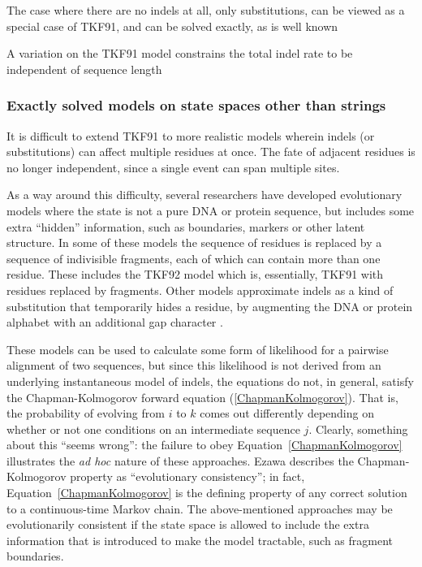 \documentclass{bmcart}
\newcommand{\eqref}[1]{Equation~\ref{#1}}
\begin{document}
The case where there are no indels at all, only substitutions, can be viewed as a special case of TKF91,
and can be solved exactly, as is well known

A variation on the TKF91 model constrains the total indel rate to be independent of sequence
length \cite{BouchardCoteJordan2013}

\subsubsection*{Exactly solved models on state spaces other than strings}

It is difficult to extend TKF91 to more realistic models wherein indels (or substitutions)
can affect multiple residues at once.
The fate of adjacent residues is no longer independent, since a single event can span multiple sites.

As a way around this difficulty, several researchers have developed
evolutionary models where the state is not a pure DNA or protein sequence,
but includes some extra ``hidden'' information,
such as boundaries, markers or other latent structure.
In some of these models the sequence of residues is replaced by a sequence of indivisible fragments,
each of which can contain more than one residue\cite{ThorneEtal92,Metzler2003,RivasEddy2015}.
These includes the TKF92 model\cite{ThorneEtal92} which is, essentially, TKF91 with residues replaced by
fragments.
Other models approximate indels as a kind of substitution that temporarily hides a residue,
by augmenting the DNA or protein alphabet with an additional gap character \cite{Rivas05,RivasEddy2008}.

These models can be used to calculate some form of likelihood for a pairwise alignment of two sequences,
but since this likelihood is not derived from an underlying instantaneous model of indels,
the equations do not, in general, satisfy the Chapman-Kolmogorov forward equation
(\ref{ChapmanKolmogorov}).
That is, the probability of evolving from $i$ to $k$ comes out differently
depending on whether or not one conditions on an intermediate sequence $j$.
Clearly, something about this ``seems wrong'':
the failure to obey \eqref{ChapmanKolmogorov} illustrates the {\em ad hoc}
nature of these approaches.
Ezawa \cite{Ezawa2016b} describes the Chapman-Kolmogorov property as ``evolutionary consistency'';
in fact, \eqref{ChapmanKolmogorov} is the defining property
of any correct solution to a continuous-time Markov chain.
The above-mentioned approaches may be evolutionarily consistent if the state space
is allowed to include the extra information that is introduced to make the model tractable,
such as fragment boundaries.
\end{document}
